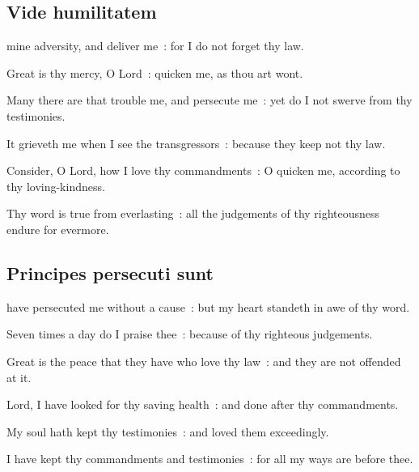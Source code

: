 \subsection{Vide humilitatem}
 mine adversity, and deliver me~: for I do not forget thy law.\par
{}
Great is thy mercy, O Lord~: quicken me, as thou art wont.\par
{}Many there are that trouble me, and persecute me~: yet do I not swerve from thy testimonies.\par
{}It grieveth me when I see the transgressors~: because they keep not thy law.\par
{}Consider, O Lord, how I love thy commandments~: O quicken me, according to thy loving-kindness.\par
{}Thy word is true from everlasting~: all the judgements of thy righteousness endure for evermore.\par

\subsection{Principes persecuti sunt}
 have persecuted me without a cause~: but my heart standeth in awe of thy word.\par
{}
Seven times a day do I praise thee~: because of thy righteous judgements.\par
{}Great is the peace that they have who love thy law~: and they are not offended at it.\par
{}Lord, I have looked for thy saving health~: and done after thy commandments.\par
{}My soul hath kept thy testimonies~: and loved them exceedingly.\par
{}I have kept thy commandments and testimonies~: for all my ways are before thee.\par

\clearpage
